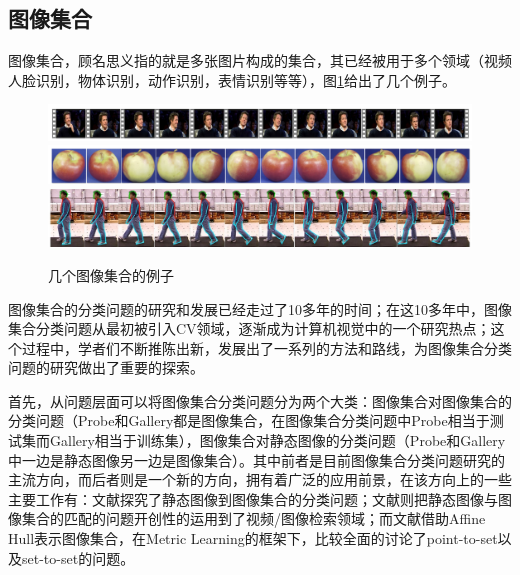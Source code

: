 \subsection{图像集合}
\label{sec:Image-Set}
图像集合，顾名思义指的就是多张图片构成的集合，其已经被用于多个领域（视频人脸识别，物体识别，动作识别，表情识别等等），图\ref{fig:image_set_exmples}给出了几个例子。
\begin{figure}[h]
      	{\includegraphics[width=\linewidth]{source/YTC_track.png}}
      	{\includegraphics[width=\linewidth]{source/ETH80_apple.png}}
    	{\includegraphics[width=\linewidth]{source/cmu_MoBo.jpg}}
  	\caption{几个图像集合的例子}
  	\label{fig:image_set_exmples}
\end{figure}

图像集合的分类问题的研究和发展已经走过了10多年的时间；在这10多年中，图像集合分类问题从最初被引入CV领域，逐渐成为计算机视觉中的一个研究热点；这个过程中，学者们不断推陈出新，发展出了一系列的方法和路线，为图像集合分类问题的研究做出了重要的探索。

首先，从问题层面可以将图像集合分类问题分为两个大类：图像集合对图像集合的分类问题（Probe和Gallery都是图像集合，在图像集合分类问题中Probe相当于测试集而Gallery相当于训练集），图像集合对静态图像的分类问题（Probe和Gallery中一边是静态图像另一边是图像集合）。其中前者是目前图像集合分类问题研究的主流方向，而后者则是一个新的方向，拥有着广泛的应用前景，在该方向上的一些主要工作有：文献\cite{Statistics_LERM}探究了静态图像到图像集合的分类问题；文献\cite{Statistics_HER}则把静态图像与图像集合的匹配的问题开创性的运用到了视频/图像检索领域；而文献\cite{Affinehull_P2SML}借助Affine Hull表示图像集合，在Metric Learning的框架下，比较全面的讨论了point-to-set以及set-to-set的问题。

